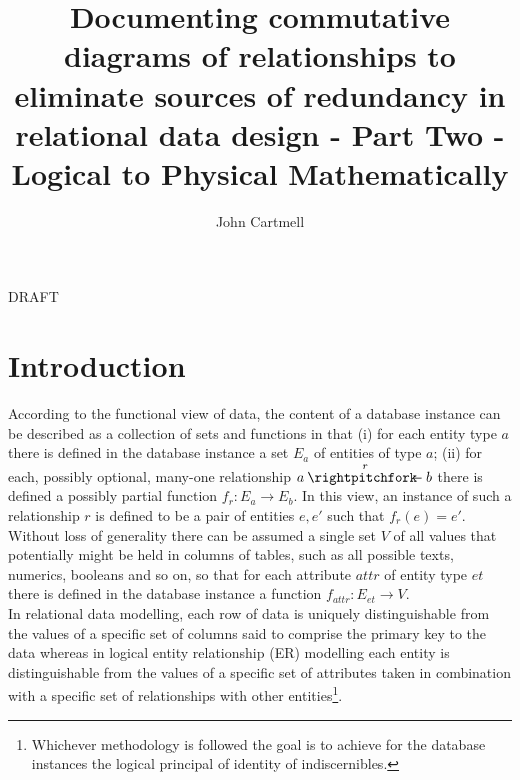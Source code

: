 \documentclass[10pt,a4paper]{article}
\begin{document}
\title{Documenting commutative diagrams of relationships to eliminate sources of redundancy in relational data design - Part Two - Logical to Physical Mathematically}

\author{John Cartmell}

\maketitle
\begin{center}
DRAFT 
\end{center}


\section{Introduction}

\noindent According to the functional view of data, the content of a 
database instance can be described as a collection of sets 
and functions in that (i) for each entity type $a$ there is defined in 
the database instance a set $E_a$ of entities of type $a$;
(ii) for each, possibly optional, 
many-one relationship $a \overset{r}{\rightpitchfork \hspace{-0.35em} -}b$
there is defined a possibly partial function $f_r : E_a \rightarrow E_b$. 
In this view, an instance of such a relationship $r$ is defined to be a pair 
of entities $e,e'$ such that $f_r(e)=e'$. Without loss of generality
there can be assumed a single set $V$ of all values 
that potentially might be held in columns of tables, 
such as all possible texts, numerics, booleans and so on,
so that for each attribute $attr$
of entity type $et$ there is defined in the database instance a function
$f_{attr}: E_{et} \rightarrow V$. \\

\noindent 
In relational data modelling, each row of data is uniquely distinguishable from the values of a specific set of columns said to 
comprise the primary key to the data whereas in logical entity relationship (ER) modelling each entity is distinguishable from the values of a specific set of attributes taken in combination with a specific set of relationships with other entities\footnote{Whichever methodology is followed the goal is to achieve for the database instances the logical principal of identity of indiscernibles.}. \\
\end{document}
